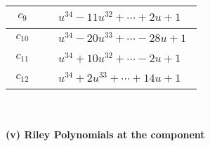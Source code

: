 \documentclass[1p]{elsarticle_modified}
\theoremstyle{definition}
\begin{document}
\begin{tabular}{m{50pt}|m{274pt}}
\hline $$\begin{aligned}c_{9}\end{aligned}$$&$\begin{aligned}
&u^{34}-11 u^{32}+\cdots+2 u+1
\end{aligned}$\\
\hline $$\begin{aligned}c_{10}\end{aligned}$$&$\begin{aligned}
&u^{34}-20 u^{33}+\cdots-28 u+1
\end{aligned}$\\
\hline $$\begin{aligned}c_{11}\end{aligned}$$&$\begin{aligned}
&u^{34}+10 u^{32}+\cdots-2 u+1
\end{aligned}$\\
\hline $$\begin{aligned}c_{12}\end{aligned}$$&$\begin{aligned}
&u^{34}+2 u^{33}+\cdots+14 u+1
\end{aligned}$\\
\hline
\end{tabular}\\~\\
\newpage\renewcommand{\arraystretch}{1}
\flushleft \textbf{(v) Riley Polynomials at the component}\newline \\
\end{document}
